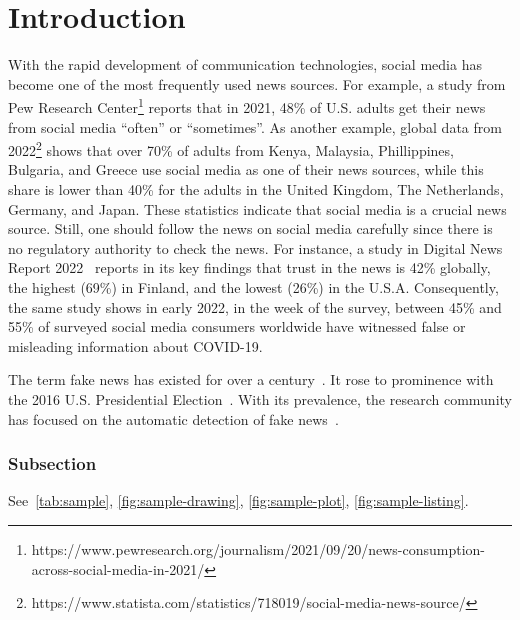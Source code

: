 
\chapter{Introduction}\label{chapter:introduction}

With the rapid development of communication technologies, social media has become one of the most frequently used news sources. For example, a study from Pew Research Center\footnote{https://www.pewresearch.org/journalism/2021/09/20/news-consumption-across-social-media-in-2021/} reports that in 2021, 48\% of U.S. adults get their news from social media “often” or “sometimes”. As another example, global data from 2022\footnote{https://www.statista.com/statistics/718019/social-media-news-source/} shows that over 70\% of adults from Kenya, Malaysia, Phillippines, Bulgaria, and Greece use social media as one of their news sources, while this share is lower than 40\% for the adults in the United Kingdom, The Netherlands, Germany, and Japan. These statistics indicate that social media is a crucial news source. Still, one should follow the news on social media carefully since there is no regulatory authority to check the news. For instance, a study in Digital News Report 2022~\parencite{ReutersInstituteDigitalNewsReport}  reports in its key findings that trust in the news is 42\% globally, the highest (69\%) in Finland, and the lowest (26\%) in the U.S.A. Consequently, the same study shows in early 2022, in the week of the survey, between 45\% and 55\% of surveyed social media consumers worldwide have witnessed false or misleading information about COVID-19.

The term fake news has existed for over a century~\parencite{TheScienceOfFakeNews_Lazer}.  It rose to prominence with the 2016 U.S. Presidential Election~\parencite{USPresidentialElection2016}. With its prevalence, the research community has focused on the automatic detection of fake news~\parencite{FakeNewsDetectionOnSocialMedia_Shu, FakeNewsNet_Shu,  LiarLiarPantsOnFire, FakeNewsDetectionUsingGeometricDeepLearning, SupervisedLearningForFakeNewsDetection}.



\subsection{Subsection}

See~\autoref{tab:sample}, \autoref{fig:sample-drawing}, \autoref{fig:sample-plot}, \autoref{fig:sample-listing}.

